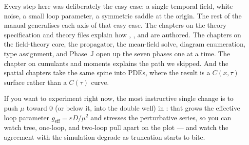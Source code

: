 Every step here was deliberately the easy case: a single temporal field, white
noise, a small loop parameter, a symmetric saddle at the origin. The rest of the
manual generalises each axis of that easy case. The chapters on the theory
specification and theory files explain how ,
, and  are authored. The chapters on the
field-theory core, the propagator, the mean-field solve, diagram enumeration,
type assignment, and Phase~J open up the seven phases one at a time. The chapter
on cumulants and moments explains the  path we skipped. And
the spatial chapters take the same 
spine into PDEs, where the result is a $C(x,\tau)$ surface rather than a
$C(\tau)$ curve.

If you want to experiment right now, the most instructive single change is to push
$\mu$ toward $0$ (or below it, into the double well) in :
that grows the effective loop parameter $g_{\mathrm{eff}} = \varepsilon D/\mu^{2}$
and stresses the perturbative series, so you can watch tree, one-loop, and
two-loop pull apart on the plot --- and watch the agreement with the simulation
degrade as truncation starts to bite.
